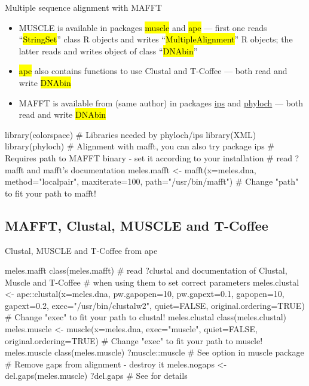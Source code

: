 \documentclass[compress, ucs, xelatex, 11pt, xcolor=svgnames,
	hyperref={
		bookmarks=true,
		unicode=true,
		colorlinks=true,
		pdftitle={Molecular data in R},
		plainpages=false,
		pdfauthor={Vojtech Zeisek},
		pdfsubject={Course about phylogeny and evolution in R},
		pdfcreator={XeLaTeX},
		pdfkeywords={R, evolution, phylogeny, molecular data},
		linkcolor=Tomato,
		anchorcolor=SaddleBrown,
		citecolor=Goldenrod,
		filecolor=DarkMagenta,
		menucolor=Sienna,
		urlcolor=DarkTurquoise,
		pdftex},
	url={hyphens, lowtilde} %
	]{beamer}
\renewcommand{\texttt}[1]{\hl{\ttfamily #1}}
\begin{document}
\begin{frame}[fragile]{Multiple sequence alignment with MAFFT}
	\begin{itemize}
		\item MUSCLE is available in packages \texttt{muscle} and \texttt{ape} --- first one reads ``\texttt{*StringSet}'' class R objects and writes ``\texttt{*MultipleAlignment}'' R objects; the latter reads and writes object of class ``\texttt{DNAbin}''
		\item \texttt{ape} also contains functions to use Clustal and T-Coffee --- both read and write \texttt{DNAbin}
		\item MAFFT is available from (same author) in packages \href{https://CRAN.R-project.org/package=ips}{ips} and \href{http://www.christophheibl.de/Rpackages.html}{phyloch} --- both read and write \texttt{DNAbin}
	\end{itemize}
	\begin{spluscode}
    library(colorspace) # Libraries needed by phyloch/ips
    library(XML)
    library(phyloch) # Alignment with mafft, you can also try package ips
    # Requires path to MAFFT binary - set it according to your installation
    # read ?mafft and mafft's documentation
    meles.mafft <- mafft(x=meles.dna, method="localpair", maxiterate=100,
      path="/usr/bin/mafft") # Change "path" to fit your path to mafft!
	\end{spluscode}
\end{frame}

\subsection{MAFFT, Clustal, MUSCLE and T-Coffee}

\begin{frame}[fragile]{Clustal, MUSCLE and T-Coffee from ape}
	\begin{spluscode}
    meles.mafft
    class(meles.mafft)
    # read ?clustal and documentation of Clustal, Muscle and T-Coffee
    # when using them to set correct parameters
    meles.clustal <- ape::clustal(x=meles.dna, pw.gapopen=10, pw.gapext=0.1,
      gapopen=10, gapext=0.2, exec="/usr/bin/clustalw2", quiet=FALSE,
      original.ordering=TRUE) # Change "exec" to fit your path to clustal!
    meles.clustal
    class(meles.clustal)
    meles.muscle <- muscle(x=meles.dna, exec="muscle", quiet=FALSE,
      original.ordering=TRUE) # Change "exec" to fit your path to muscle!
    meles.muscle
    class(meles.muscle)
    ?muscle::muscle # See option in muscle package
    # Remove gaps from alignment - destroy it
    meles.nogaps <- del.gaps(meles.muscle)
    ?del.gaps # See for details
	\end{spluscode}
\end{frame}
\end{document}
